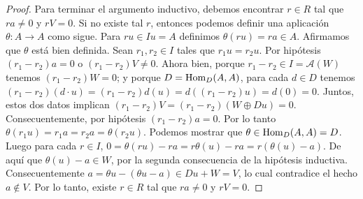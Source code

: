 \documentclass{report}
\newcommand{\Hom}{\textnormal{Hom}}
\begin{document}
\begin{proof}
    Para terminar el argumento inductivo, debemos encontrar \(r \in R\) tal que \(r a \neq 0\) y \(r V = 0\).
    Si no existe tal \(r\), entonces podemos definir una aplicación \(\theta : A \rightarrow A\) como sigue.
    Para \(r u \in I u = A\) definimos \(\theta(r u) = r a \in A\).
    Afirmamos que \(\theta\) está bien definida.
    Sean \(r_1, r_2 \in I\) tales que \(r_1 u = r_2 u\).
    Por hipótesis \((r_1 - r_2) a = 0\) o \((r_1 - r_2) V \neq 0\).
    Ahora bien, porque \(r_1 - r_2 \in I = \mathcal{A}(W)\) tenemos \((r_1 - r_2) W = 0\);
    y porque \(D = \Hom_D(A, A)\), para cada \(d \in D\) tenemos \((r_1 - r_2) (d \cdot u) = (r_1 - r_2) d(u) = d((r_1 - r_2) u) = d(0) = 0\).
    Juntos, estos dos datos implican \((r_1 - r_2) V = (r_1 - r_2) (W \oplus D u) = 0\).
    Consecuentemente, por hipótesis \((r_1 - r_2) a = 0\).
    Por lo tanto \(\theta(r_1 u) = r_1 a = r_2 a = \theta(r_2 u)\).
    Podemos mostrar que \(\theta \in \Hom_D(A, A) = D\).
    Luego para cada \(r \in I\), \(0 = \theta(r u) - r a = r \theta(u) - r a = r(\theta(u) - a)\).
    De aquí que \(\theta(u) - a \in W\), por la segunda consecuencia de la hipótesis inductiva.
    Consecuentemente \(a = \theta u - (\theta u - a) \in D u + W = V\),
    lo cual contradice el hecho \(a \notin V\).
    Por lo tanto, existe \(r \in R\) tal que \(r a \neq 0\) y \(r V = 0\).
  \end{proof}
\end{document}
